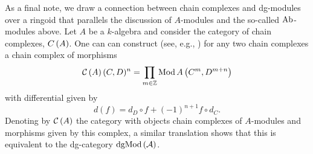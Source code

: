As a final note, we draw a connection between chain complexes and dg-modules over a ringoid that parallels the discussion of $A$-modules and the so-called $\operatorname{Ab}$-modules above.
Let $A$ be a $k$-algebra and consider the category of chain complexes, $C\left(A\right)$.
One can can construct (see, e.g., \parencite{Weibel94}) for any two chain complexes a chain complex of morphisms
\[\mathcal{C}\left(A\right)(C,D)^n = \prod_{m \in \mathbb{Z}}\operatorname{Mod}A\left(C^m, D^{m + n}\right)\]
with differential given by
\[d(f) = d_D \circ f + (-1)^{n+1} f \circ d_C.\]
Denoting by $\mathcal{C}\left(A\right)$ the category with objects chain complexes of $A$-modules and morphisms given by this complex, a similar translation shows that this is equivalent to the dg-category $\operatorname{dgMod}\left(\mathcal{A}\right)$.

